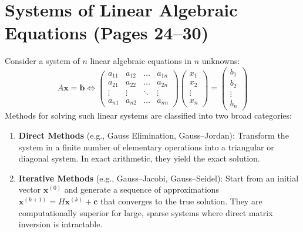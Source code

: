 \chapter{Systems of Linear Algebraic Equations (Pages 24--30)}
\label{ch:linear_systems}

\begin{conceptbox}
Consider a system of $n$ linear algebraic equations in $n$ unknowns:
\begin{equation}
    A \mathbf{x} = \mathbf{b} \iff \begin{pmatrix}
    a_{11} & a_{12} & \dots & a_{1n} \\
    a_{21} & a_{22} & \dots & a_{2n} \\
    \vdots & \vdots & \ddots & \vdots \\
    a_{n1} & a_{n2} & \dots & a_{nn}
    \end{pmatrix}
    \begin{pmatrix} x_1 \\ x_2 \\ \vdots \\ x_n \end{pmatrix}
    =
    \begin{pmatrix} b_1 \\ b_2 \\ \vdots \\ b_n \end{pmatrix}
\end{equation}
Methods for solving such linear systems are classified into two broad categories:
\begin{enumerate}
    \item \textbf{Direct Methods} (e.g., Gauss Elimination, Gauss--Jordan): Transform the system in a finite number of elementary operations into a triangular or diagonal system. In exact arithmetic, they yield the exact solution.
    \item \textbf{Iterative Methods} (e.g., Gauss--Jacobi, Gauss--Seidel): Start from an initial vector $\mathbf{x}^{(0)}$ and generate a sequence of approximations $\mathbf{x}^{(k+1)} = H \mathbf{x}^{(k)} + \mathbf{c}$ that converges to the true solution. They are computationally superior for large, sparse systems where direct matrix inversion is intractable.
\end{enumerate}
\end{conceptbox}

